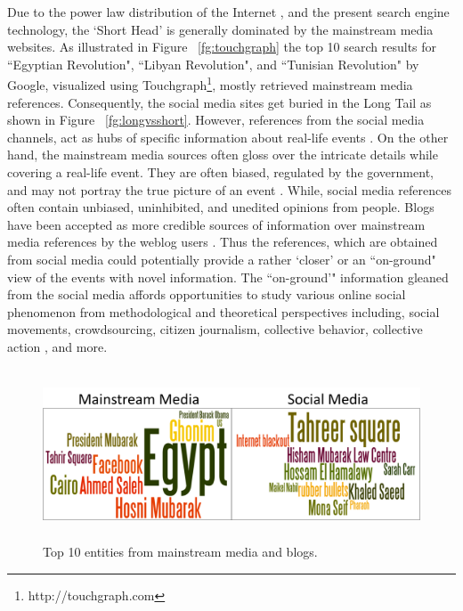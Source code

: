 Due to the power law distribution of the Internet \cite{adamic2000power}, and the present search engine technology, the `Short Head' is generally dominated by the mainstream media websites. As illustrated in Figure ~\ref{fg:touchgraph} the top 10 search results for ``Egyptian Revolution", ``Libyan Revolution", and ``Tunisian Revolution" by Google, visualized using Touchgraph\footnote{http://touchgraph.com}, mostly retrieved mainstream media references. Consequently, the social media sites get buried in the Long Tail \cite{LOmariba} as shown in Figure ~\ref{fg:longvsshort}. However, references from the social media channels, act as hubs of specific information about real-life events \cite{harb2011arab}. On the other hand, the mainstream media sources often gloss over the intricate details while covering a real-life event. They are often biased, regulated by the government, and may not portray the true picture of an event \cite{hamdy2012framing}. While, social media references often contain unbiased, uninhibited, and unedited opinions from people. Blogs have been accepted as more credible sources of information over mainstream media references by the weblog users \cite{johnson2004wag}. Thus the references, which are obtained from social media could potentially provide a rather `closer'  or an ``on-ground" view of the events with novel information. The ``on-ground'" information gleaned from the social media affords opportunities to study various online social phenomenon from methodological and theoretical perspectives including, social movements, crowdsourcing, citizen journalism, collective behavior, collective action \cite{agarwal2011finding,agarwal2012online,agarwal2012raising}, and more.

\begin{figure}[htbp]
\centering
\includegraphics[height=2in,width=4.5in]{Figures/Chapter3Figures/comp.pdf}
\caption{Top 10 entities from mainstream media and blogs.}
\label{fg:comp}
\end{figure}

